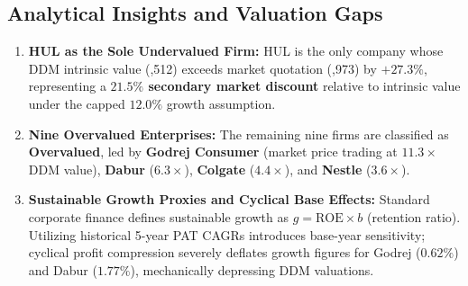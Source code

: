 \subsection{Analytical Insights and Valuation Gaps}
\begin{enumerate}[label=\textbf{\arabic*.}, topsep=2pt, itemsep=1.5pt, parsep=0pt]
    \item \textbf{HUL as the Sole Undervalued Firm:} HUL is the only company whose DDM intrinsic value (,512) exceeds market quotation (,973) by \textbf{$+27.3\%$}, representing a \textbf{$21.5\%$ secondary market discount} relative to intrinsic value under the capped $12.0\%$ growth assumption.
    \item \textbf{Nine Overvalued Enterprises:} The remaining nine firms are classified as \textbf{Overvalued}, led by \textbf{Godrej Consumer} (market price trading at $11.3\times$ DDM value), \textbf{Dabur} ($6.3\times$), \textbf{Colgate} ($4.4\times$), and \textbf{Nestle} ($3.6\times$).
    \item \textbf{Sustainable Growth Proxies and Cyclical Base Effects:} Standard corporate finance defines sustainable growth as $g = \text{ROE} \times b$ (retention ratio). Utilizing historical 5-year PAT CAGRs introduces base-year sensitivity; cyclical profit compression severely deflates growth figures for Godrej ($0.62\%$) and Dabur ($1.77\%$), mechanically depressing DDM valuations.
\end{enumerate}
